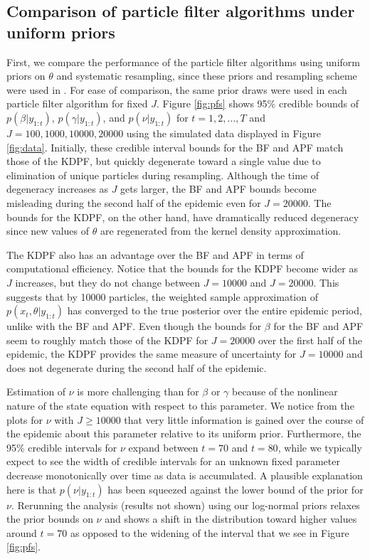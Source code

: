 \documentclass{elsarticle}
\begin{document}
\subsection{Comparison of particle filter algorithms under uniform priors} \label{sec:pfcomparison}

First, we compare the performance of the particle filter algorithms using uniform priors on $\theta$ and systematic resampling, since these priors and resampling scheme were used in \citet{skvortsov2012monitoring}. For ease of comparison, the same prior draws were used in each particle filter algorithm for fixed $J$. Figure \ref{fig:pfs} shows 95\% credible bounds of $p(\beta|y_{1:t})$, $p(\gamma|y_{1:t})$, and $p(\nu|y_{1:t})$ for $t = 1,2,\ldots,T$ and $J = 100, 1000, 10000, 20000$ using the simulated data displayed in Figure \ref{fig:data}. Initially, these credible interval bounds for the BF and APF match those of the KDPF, but quickly degenerate toward a single value due to elimination of unique particles during resampling. Although the time of degeneracy increases as $J$ gets larger, the BF and APF bounds become misleading during the second half of the epidemic even for $J = 20000$. The bounds for the KDPF, on the other hand, have dramatically reduced degeneracy since new values of $\theta$ are regenerated from the kernel density approximation.

The KDPF also has an advantage over the BF and APF in terms of computational efficiency. Notice that the bounds for the KDPF become wider as $J$ increases, but they do not change between $J = 10000$ and $J = 20000$. This suggests that by 10000 particles, the weighted sample approximation of $p(x_t,\theta|y_{1:t})$ has converged to the true posterior over the entire epidemic period, unlike with the BF and APF. Even though the bounds for $\beta$ for the BF and APF seem to roughly match those of the KDPF for $J = 20000$ over the first half of the epidemic, the KDPF provides the same measure of uncertainty for $J = 10000$ and does not degenerate during the second half of the epidemic.

Estimation of $\nu$ is more challenging than for $\beta$ or $\gamma$ because of the nonlinear nature of the state equation with respect to this parameter. We notice from the plots for $\nu$ with $J \ge 10000$ that very little information is gained over the course of the epidemic about this parameter relative to its uniform prior. Furthermore, the 95\% credible intervals for $\nu$ expand between $t = 70$ and $t = 80$, while we typically expect to see the width of credible intervals for an unknown fixed parameter decrease monotonically over time as data is accumulated. A plausible explanation here is that $p(\nu|y_{1:t})$ has been squeezed against the lower bound of the prior for $\nu$. Rerunning the analysis (results not shown) using our log-normal priors relaxes the prior bounds on $\nu$ and shows a shift in the distribution toward higher values around $t = 70$ as opposed to the widening of the interval that we see in Figure \ref{fig:pfs}.
\end{document}
